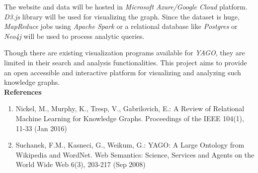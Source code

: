 \documentclass[11pt,a4paper,oneside]{article}
\begin{document}
	The website and data will be hosted in \emph{Microsoft Azure/Google Cloud} platform. \emph{D3.js} library will be used for visualizing the graph. Since the dataset is huge, \emph{MapReduce} jobs using \emph{Apache Spark} or a relational database like \emph{Postgres} or \emph{Neo4j} will be used to process analytic queries.
	
	Though there are existing visualization programs available for \emph{YAGO}, they are limited in their search and analysis functionalities. This project aims to provide an open accessible and interactive platform for visualizing and analyzing such knowledge graphs. \\
	
    \textbf{References}
    \begin{enumerate}
    	\item  Nickel, M., Murphy, K., Tresp, V., Gabrilovich, E.: A Review of Relational Machine Learning for Knowledge Graphs. Proceedings of the IEEE 104(1), 11-33 (Jan 2016)
    	\item  Suchanek, F.M., Kasneci, G., Weikum, G.: YAGO: A Large Ontology from	Wikipedia and WordNet. Web Semantics: Science, Services and Agents on the World Wide Web 6(3), 203-217 (Sep 2008)
    \end{enumerate}
 

    
\end{document}
